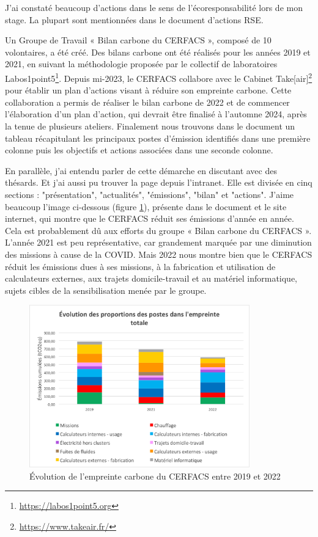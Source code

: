     J'ai constaté beaucoup d'actions dans le sens de l'écoresponsabilité lors de mon stage. La plupart sont mentionnées dans le document d'actions RSE.

    Un Groupe de Travail « Bilan carbone du CERFACS », composé de 10 volontaires, a été créé. Des bilans carbone ont été réalisés pour les années 2019 et 2021, en suivant la méthodologie proposée par le collectif de laboratoires Labos1point5\footnote{\url{https://labos1point5.org}}. Depuis mi-2023, le CERFACS collabore avec le Cabinet Take[air]\footnote{\url{https://www.takeair.fr/}} pour établir un plan d’actions visant à réduire son empreinte carbone. Cette collaboration a permis de réaliser le bilan carbone de 2022 et de commencer l'élaboration d'un plan d'action, qui devrait être finalisé à l’automne 2024, après la tenue de plusieurs ateliers. Finalement nous trouvons dans le document un tableau  récapitulant les principaux postes d'émission identifiés dans une première colonne puis les objectifs et actions associées dans une seconde colonne.

    En parallèle, j'ai entendu parler de cette démarche en discutant avec des thésards. Et j'ai aussi pu trouver la page depuis l'intranet. Elle est divisée en cinq sections : "présentation", "actualités", "émissions", "bilan" et "actions".
    J'aime beaucoup l'image ci-dessous (figure \ref{fig:evolution_empreinte_carbone}), présente dans le document et le site internet, qui montre que le CERFACS réduit ses émissions d'année en année. Cela est probablement dû aux efforts du groupe « Bilan carbone du CERFACS ». L'année 2021 est peu représentative, car grandement marquée par une diminution des missions à cause de la COVID. Mais 2022 nous montre bien que le CERFACS réduit les émissions dues à ses missions, à la fabrication et utilisation de calculateurs externes, aux trajets domicile-travail et au matériel informatique, sujets cibles de la sensibilisation menée par le groupe.

    \begin{figure}[H]
        \centering
        \includegraphics[width=0.85\textwidth]{images/evolution_postes_empreintecarbone.png}
        \caption{Évolution de l'empreinte carbone du CERFACS entre 2019 et 2022}
        \label{fig:evolution_empreinte_carbone}
    \end{figure}

